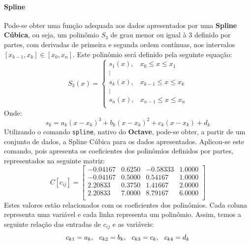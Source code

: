\documentclass{article}
\begin{document}
            \paragraph{Spline}Pode-se obter uma função adequada aos dados apresentados por uma \textbf{Spline Cúbica}, ou seja, um polinômio $S_{3}$ de grau menor ou igual à 3 definido por partes, com derivadas de primeira e segunda ordem contínuas, nos intervalos $[x_{k-1}, x_{k}] \in [x_{0}, x_{n}]$. Este polinômio será definido pela seguinte equação:
                \[S_{3}(x) = 
                    \begin{cases}
                        s_{1}(x), & x_{0} \leq x \leq x_{1}\\
                        \vdots &\\
                        s_{k}(x), & x_{k-1} \leq x \leq x_{k}\\
                        \vdots &\\
                        s_{n}(x), & x_{n-1} \leq x \leq x_{n}\\
                    \end{cases}
                \]
            Onde:
                \[s_{k} = a_{k}(x - x_{k})^3 + b_{k}(x - x_{k})^2 + c_{k}(x - x_{k}) + d_{k}\]
            Utilizando o comando \texttt{spline}, nativo do \textbf{Octave}, pode-se obter, a partir de um conjunto de dados, a Spline Cúbica para os dados apresentados. Aplicou-se este comando, pois apresenta os coeficientes dos polinômios definidos por partes, representados na seguinte matriz:
                \[C[c_{ij}] =
                    \begin{bmatrix}
                        -0.04167 & 0.6250 &-0.58333 & 1.0000\\
                        -0.04167 & 0.5000 & 0.54167 & 1.0000\\
                         2.20833 & 0.3750 & 1.41667 & 2.0000\\
                         2.20833 & 7.0000 & 8.79167 & 6.0000\\
                    \end{bmatrix}
                \]
            Estes valores estão relacionados com os coeficientes dos polinômios. Cada coluna representa uma variável e cada linha representa um polinômio. Assim, temos a seguinte relação das entradas de $c_{ij}$ e as variáveis:
                \[c_{k 1} = a_{k}, \hspace{2.5mm} c_{k 2} = b_{k}, \hspace{2.5mm} c_{k 3} = c_{k}, \hspace{2.5mm} c_{k 4} = d_{k}\]
\end{document}
